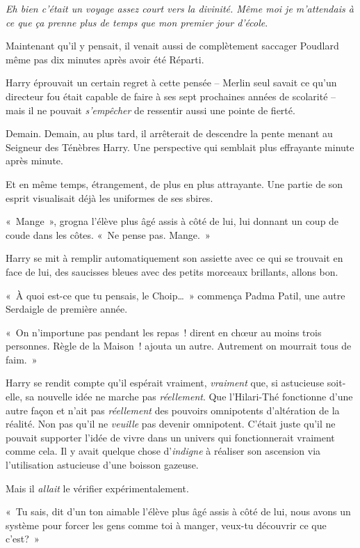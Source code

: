 \emph{Eh bien c'était un voyage assez court vers la divinité.
Même moi je m'attendais à ce que ça prenne plus de temps que mon premier jour d'école}.

Maintenant qu'il y pensait, il venait aussi de complètement saccager Poudlard même pas dix minutes après avoir été Réparti.

Harry éprouvait un certain regret à cette pensée -- Merlin seul savait ce qu'un directeur fou était capable de faire à ses sept prochaines années de scolarité -- mais il ne pouvait \emph{s'empêcher} de ressentir aussi une pointe de fierté.

Demain. Demain, au plus tard, il arrêterait de descendre la pente menant au Seigneur des Ténèbres Harry.
Une perspective qui semblait plus effrayante minute après minute.

Et en même temps, étrangement, de plus en plus attrayante.
Une partie de son esprit visualisait déjà les uniformes de ses sbires.

«~Mange~», grogna l'élève plus âgé assis à côté de lui, lui donnant un coup de coude dans les côtes.
«~Ne pense pas. Mange.~»

Harry se mit à remplir automatiquement son assiette avec ce qui se trouvait en face de lui, des saucisses bleues avec des petits morceaux brillants, allons bon.

«~À quoi est-ce que tu pensais, le Choip…~» commença Padma Patil, une autre Serdaigle de première année.

«~On n'importune pas pendant les repas~! dirent en chœur au moins trois personnes.
Règle de la Maison~! ajouta un autre. Autrement on mourrait tous de faim.~»

Harry se rendit compte qu'il espérait vraiment, \emph{vraiment} que, si astucieuse soit-elle, sa nouvelle idée ne marche pas \emph{réellement}.
Que l'Hilari-Thé fonctionne d'une autre façon et n'ait pas \emph{réellement} des pouvoirs omnipotents d'altération de la réalité.
Non pas qu'il ne \emph{veuille} pas devenir omnipotent.
C'était juste qu'il ne pouvait supporter l'idée de vivre dans un univers qui fonctionnerait vraiment comme cela.
Il y avait quelque chose d'\emph{indigne} à réaliser son ascension via l'utilisation astucieuse d'une boisson gazeuse.

Mais il \emph{allait} le vérifier expérimentalement.

«~Tu sais, dit d'un ton aimable l'élève plus âgé assis à côté de lui, nous avons un système pour forcer les gens comme toi à manger, veux-tu découvrir ce que c'est?~»

